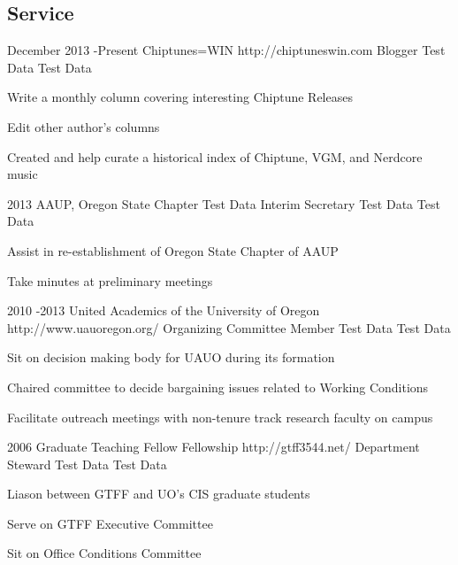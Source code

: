 \documentclass[10pt]{article} %
\begin{document}
\begin{itemize-noindent}

\section{Service}

\job
{December 2013 -}{Present}
{Chiptunes=WIN}
{http://chiptuneswin.com}
{Blogger}
{Test Data}
{Test Data}

\begin{itemize-noindent}
\item{Write a monthly column covering interesting Chiptune Releases}
\item{Edit other author's columns}
\item{Created and help curate a historical index of Chiptune, VGM, and Nerdcore music}
\end{itemize-noindent}

\job
{2013}
{AAUP, Oregon State Chapter}
{Test Data}
{Interim Secretary}
{Test Data}
{Test Data}

\begin{itemize-noindent}
\item{Assist in re-establishment of Oregon State Chapter of AAUP}
\item{Take minutes at preliminary meetings}
\end{itemize-noindent}

\job
{2010 -}{2013}
{United Academics of the University of Oregon}
{http://www.uauoregon.org/}
{Organizing Committee Member}
{Test Data}
{Test Data}

\begin{itemize-noindent}
\item{Sit on decision making body for UAUO during its formation}
\item{Chaired committee to decide bargaining issues related to Working Conditions}
\item{Facilitate outreach meetings with non-tenure track research faculty on campus}
\end{itemize-noindent}

\job
{2006}
{Graduate Teaching Fellow Fellowship}
{http://gtff3544.net/}
{Department Steward}
{Test Data}
{Test Data}

\begin{itemize-noindent}
\item{Liason between GTFF and UO's CIS graduate students}
\item{Serve on GTFF Executive Committee}
\item{Sit on Office Conditions Committee}
\end{itemize-noindent}


\end{itemize-noindent}
\end{document}
